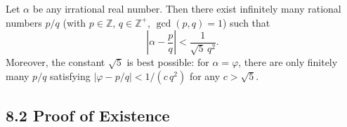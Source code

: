 \begin{theorem}[Hurwitz, 1891]
\label{thm:gc-hurwitz}
Let $\alpha$ be any irrational real number.
Then there exist infinitely many rational numbers
$p/q$ (with $p \in \mathbb{Z}$, $q \in \mathbb{Z}^+$,
$\gcd(p,q)=1$) such that
\[
  \left|\alpha - \frac{p}{q}\right| < \frac{1}{\sqrt{5}\,q^2}.
\]
Moreover, the constant $\sqrt{5}$ is best possible:
for $\alpha = \varphi$, there are only finitely many
$p/q$ satisfying $|\varphi - p/q| < 1/(c\,q^2)$ for
any $c > \sqrt{5}$.
\end{theorem}

\subsection{8.2 Proof of Existence}
\label{subsec:gc-hurwitz-existence}

